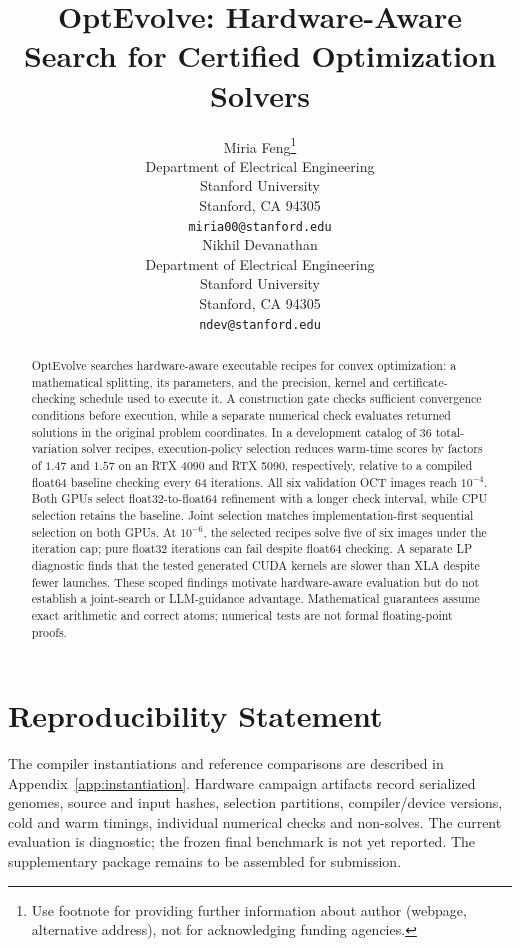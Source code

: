 \documentclass{article}
\title{OptEvolve: Hardware-Aware Search for Certified Optimization Solvers}
\author{%
  Miria Feng\thanks{Use footnote for providing further information
    about author (webpage, alternative address), not for acknowledging
    funding agencies.} \\
  Department of Electrical Engineering\\
  Stanford University\\
  Stanford, CA 94305 \\
  \texttt{miria00@stanford.edu} \\
  \And
  Nikhil Devanathan \\
  Department of Electrical Engineering \\
  Stanford University \\
  Stanford, CA 94305 \\
  \texttt{ndev@stanford.edu} \\
}
\theoremstyle{definition}
\theoremstyle{remark}
\begin{document}
\maketitle


\begin{abstract}
OptEvolve searches hardware-aware executable recipes for convex optimization:
a mathematical splitting, its parameters, and the precision, kernel and
certificate-checking schedule used to execute it. A construction gate checks
sufficient convergence conditions before execution, while a separate numerical
check evaluates returned solutions in the original problem coordinates.
In a development catalog of 36 total-variation solver recipes, execution-policy
selection reduces warm-time scores by factors of $1.47$ and $1.57$ on an
RTX 4090 and RTX 5090, respectively, relative to a compiled float64 baseline
checking every 64 iterations. All six validation OCT images reach $10^{-4}$.
Both GPUs select float32-to-float64 refinement with a longer check interval,
while CPU selection retains the baseline. Joint selection matches
implementation-first sequential selection on both GPUs. At $10^{-6}$, the
selected recipes solve five of six images under the iteration cap; pure
float32 iterations can fail despite float64 checking. A separate LP
diagnostic finds that the tested generated CUDA kernels are slower than XLA
despite fewer launches. These scoped findings motivate hardware-aware
evaluation but do not establish a joint-search or LLM-guidance advantage.
Mathematical guarantees assume exact arithmetic and correct atoms; numerical
tests are not formal floating-point proofs.
\end{abstract}















\section*{Reproducibility Statement}
The compiler instantiations and reference comparisons are described in
Appendix~\ref{app:instantiation}. Hardware campaign artifacts record serialized
genomes, source and input hashes, selection partitions, compiler/device
versions, cold and warm timings, individual numerical checks and non-solves.
The current evaluation is diagnostic; the frozen final benchmark is not yet
reported. The supplementary package remains to be assembled for submission.
\end{document}
